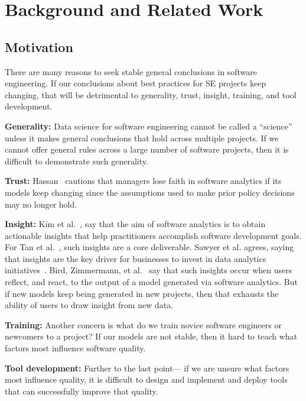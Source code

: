\documentclass[10pt,journal,compsoc]{IEEEtran}
\begin{document}
\section{Background and Related Work}
\label{sec:literature}

\subsection{Motivation}
\label{sec:Motivation}
There are many reasons to seek stable general conclusions in software engineering. If our conclusions about best practices for SE projects keep changing, that will be detrimental to generality, trust, insight, training, and tool development.

\textbf{Generality:} Data science for software engineering cannot be called a ``science'' unless it makes general conclusions that hold across  multiple  projects. If we cannot offer general rules across a large number of software projects, then it is   difficult to demonstrate such generality.

\textbf{Trust:} Hassan~\cite{Hassan17} cautions that managers lose faith in software analytics if its models keep changing since  the assumptions used to make prior policy decisions may no longer hold.

\textbf{Insight:} Kim et al.~\cite{Kim2016}, say  that the aim of software analytics is to obtain actionable insights that help practitioners accomplish software development goals. For Tan et al.~\cite{tan2016defining}, such   insights  are a core deliverable. Sawyer et al. agrees, saying that  insights are the key driver for businesses to invest in data analytics initiatives~\cite{sawyer2013bi}. Bird, Zimmermann, et al.~\cite{Bird:2015} say that such  insights occur when users reflect, and react, to the output of a model generated via software analytics. But if  new models keep being generated in new projects, then that exhausts the ability of  users to draw insight from  new data.

\textbf{Training:} Another concern is what do we train novice software engineers or newcomers to a project? If our models are not stable, then it hard to teach what factors  most influence software quality.

\textbf{Tool development:} Further to the last point--- if we are unsure what factors most influence quality, it is difficult to design and implement and deploy tools that can successfully improve that quality.
\end{document}
